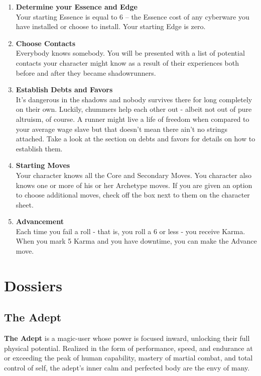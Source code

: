 \begin{enumerate}
    \item \textbf{Determine your Essence and Edge} \\
    Your starting Essence is equal to 6 – the Essence cost of any cyberware you have installed or choose to install. Your starting Edge is zero.
    
    \item \textbf{Choose Contacts} \\
    Everybody knows somebody. You will be presented with a list of potential contacts your character might know as a result of their experiences both before and after they became shadowrunners.
    
    \item \textbf{Establish Debts and Favors} \\
    It's dangerous in the shadows and nobody survives there for long completely on their own. Luckily, chummers help each other out - albeit not out of pure altruism, of course. A runner might live a life of freedom when compared to your average wage slave but that doesn't mean there ain't no strings attached. Take a look at the section on \refname{debts and favors} for details on how to establish them.
    
    \item \textbf{Starting Moves} \\
    Your character knows all the Core and Secondary Moves. You character also knows one or more of his or her Archetype moves. If you are given an option to choose additional moves, check off the box next to them on the character sheet.
    
    \item \textbf{Advancement} \\
    Each time you fail a roll - that is, you roll a 6 or less - you receive Karma. When you mark 5 Karma and you have downtime, you can make the Advance move.
\end{enumerate}



\clearpage
\section{Dossiers} \label{Dossiers}
\subsection{The Adept}
\textbf{The Adept} is a magic-user whose power is focused inward, unlocking their full physical potential. Realized in the form of performance, speed, and endurance at or exceeding the peak of human capability, mastery of martial combat, and total control of self, the adept’s inner calm and perfected body are the envy of many.

